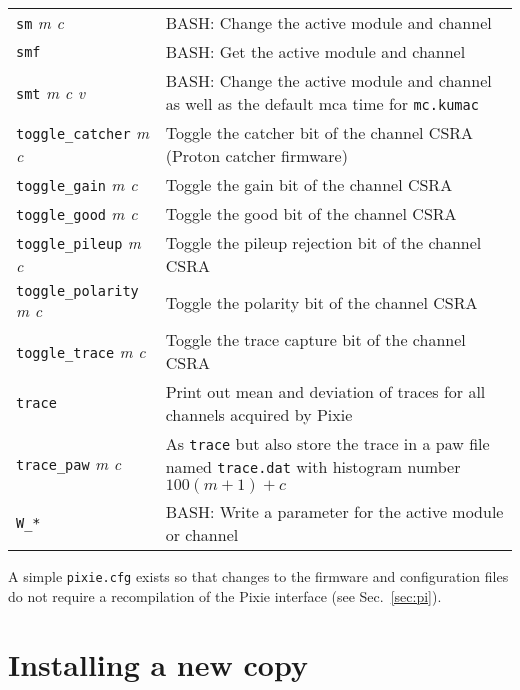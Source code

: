 \documentclass{article}
\begin{document}
\begin{longtable}{lp{3in}}
\texttt{sm} {\it m c} & \textsc{BASH:} Change the active module and channel \\
\texttt{smf} & \textsc{BASH:} Get the active module and channel \\
\texttt{smt} {\it m c v} & \textsc{BASH:} Change the active module and channel as well as the default mca time for \texttt{mc.kumac} \\
\texttt{toggle\_catcher} {\it m c} & Toggle the catcher bit of the channel CSRA (Proton catcher firmware)\\
\texttt{toggle\_gain} {\it m c} & Toggle the gain bit of the channel CSRA\\
\texttt{toggle\_good} {\it m c} & Toggle the good bit of the channel CSRA\\
\texttt{toggle\_pileup} {\it m c} & Toggle the pileup rejection bit of the channel CSRA\\
\texttt{toggle\_polarity} {\it m c} & Toggle the polarity bit of the channel CSRA\\
\texttt{toggle\_trace} {\it m c} & Toggle the trace capture bit of the channel CSRA\\
\texttt{trace} & Print out mean and deviation of traces for all channels acquired by Pixie \\
\texttt{trace\_paw} {\it m c} & As \texttt{trace} but also store the trace in a paw file named \texttt{trace.dat} with histogram number $100(m+1) + c$ \\
\texttt{W\_*} & \textsc{BASH:} Write a parameter for the active module or channel \\
\end{longtable}
A simple \texttt{pixie.cfg} exists so that changes to the firmware and configuration files do not require a recompilation of the Pixie interface (see Sec.~\ref{sec:pi}).
\section{\label{sec:install}Installing a new copy}
\end{document}
